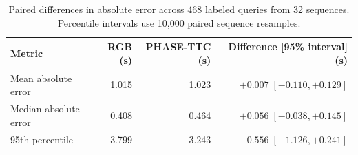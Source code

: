 \begin{table}[H]\centering\small
\caption{Paired differences in absolute error across 468 labeled queries from 32 sequences. Percentile intervals use 10,000 paired sequence resamples. }
\label{tab:revision-bootstrap}
\begin{tabular}{@{}lrrr@{}}\toprule
Metric & RGB (s) & PHASE-TTC (s) & Difference [95\% interval] (s)\\\midrule
Mean absolute error & 1.015 & 1.023 & $+0.007\;[-0.110,+0.129]$ \\
Median absolute error & 0.408 & 0.464 & $+0.056\;[-0.038,+0.145]$ \\
95th percentile & 3.799 & 3.243 & $-0.556\;[-1.126,+0.241]$ \\
\bottomrule\end{tabular}
\end{table}